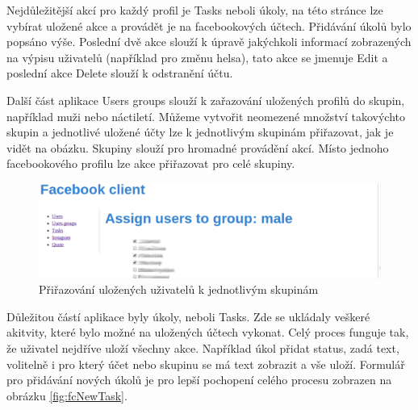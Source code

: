 \documentclass[thesis=M,czech]{FITthesis}[2013/05/10]
\begin{document}
Nejdůležitější akcí pro každý profil je Tasks neboli úkoly, na této stránce lze vybírat uložené akce a provádět je na facebookových účtech. Přidávání úkolů bylo popsáno výše. Poslední dvě akce slouží k úpravě jakýchkoli informací  zobrazených na výpisu uživatelů (například pro změnu helsa), tato akce se jmenuje Edit a poslední akce Delete slouží k odstranění účtu.

Další část aplikace Users groups slouží k zařazování uložených profilů do skupin, například muži nebo náctiletí. Můžeme vytvořit neomezené množství takovýchto skupin a jednotlivé uložené účty lze k jednotlivým skupinám přiřazovat, jak je vidět na obázku. Skupiny slouží pro hromadné provádění akcí. Místo jednoho facebookového profilu lze akce přiřazovat pro celé skupiny.

\begin{figure}[h]
\begin{center}
\includegraphics[width=5in]{figures/fcAssignGroup.png}
\caption{Přiřazování uložených uživatelů k jednotlivým skupinám}
\label{fig:fcAssignGroup}
\end{center}
\end{figure}

Důležitou částí aplikace byly úkoly, neboli Tasks. Zde se ukládaly veškeré akitvity, které bylo možné na uložených účtech vykonat. Celý proces funguje tak, že uživatel nejdříve uloží všechny akce. Například úkol přidat status, zadá text, volitelně i pro který účet nebo skupinu se má text zobrazit a vše uloží. Formulář pro přidávání nových úkolů je pro lepší pochopení celého procesu zobrazen na obrázku \ref{fig:fcNewTask}.
\end{document}
